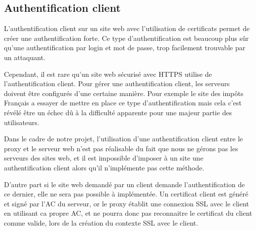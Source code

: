 \subsection{Authentification client}

L'authentification client sur un site web avec l'utilisation de certificats permet de créer une authentification forte.
Ce type d'authentification est beaucoup plus sûr qu'une authentification par 
login et mot de passe, trop facilement trouvable par un attaquant.

Cependant, il est rare qu'un site web sécurisé avec HTTPS utilise de l'authentification 
client. Pour gérer une authentification client, les serveurs doivent être configurés d'une certaine manière. 
Pour exemple le site des impôts Français a essayer de mettre en place ce 
type d'authentification mais cela c'est révélé être un échec dû à la difficulté 
apparente pour une majeur partie des utilisateurs.

Dans le cadre de notre projet, l'utilisation d'une authentification client entre le proxy et le serveur web n'est 
pas réalisable du fait que nous ne gérons pas les serveurs des sites web, et il 
est impossible d'imposer à un site une authentification client alors qu'il 
n'implémente pas cette méthode.

D'autre part si le site web demandé par un client demande l'authentification de 
ce dernier, elle ne sera pas possible à implémentée. Un certificat client est 
généré et signé par l'AC du serveur, or le proxy établit une connexion SSL avec 
le client en utilisant ca propre AC, et ne pourra donc pas reconnaitre le 
certificat du client comme valide, lors de la création du contexte SSL avec le client. 

